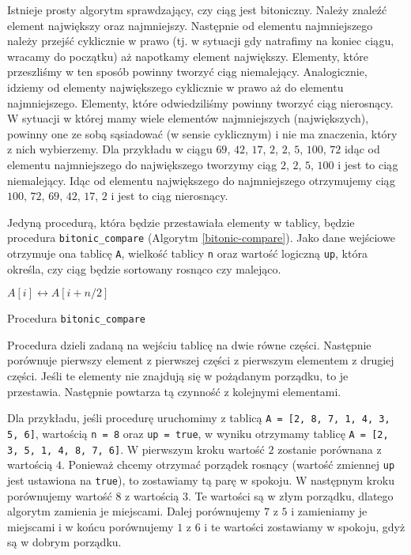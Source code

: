 Istnieje prosty algorytm sprawdzający, czy ciąg jest bitoniczny.
Należy znaleźć element największy oraz najmniejszy.
Następnie od elementu najmniejszego należy przejść cyklicznie w prawo (tj. w sytuacji gdy natrafimy na koniec ciągu, wracamy do początku) aż napotkamy element największy.
Elementy, które przeszliśmy w ten sposób powinny tworzyć ciąg niemalejący.
Analogicznie, idziemy od elementy największego cyklicznie w prawo aż do elementu najmniejszego.
Elementy, które odwiedziliśmy powinny tworzyć ciąg nierosnący.
W sytuacji w której mamy wiele elementów najmniejszych (największych), powinny one ze sobą sąsiadować (w sensie cyklicznym) i nie ma znaczenia, który z nich wybierzemy.
Dla przykładu w ciągu  $69$, $42$, $17$, $2$, $2$, $5$, $100$, $72$ idąc od elementu najmniejszego do największego tworzymy ciąg $2$, $2$, $5$, $100$ i jest to ciąg niemalejący.
Idąc od elementu największego do najmniejszego otrzymujemy ciąg $100$, $72$, $69$, $42$, $17$, $2$ i jest to ciąg nierosnący.

Jedyną procedurą, która będzie przestawiała elementy w tablicy, będzie procedura \texttt{bitonic\_compare} (Algorytm \ref{bitonic-compare}).
Jako dane wejściowe otrzymuje ona tablicę \texttt{A}, wielkość tablicy \texttt{n} oraz wartość logiczną \texttt{up}, która określa, czy ciąg będzie sortowany rosnąco czy malejąco.
\begin{algorithm}[h]
  \DontPrintSemicolon

  
  {
    {
      $A[i] \leftrightarrow A[i+n/2]$\;
    }
  }
  \caption{Procedura \texttt{bitonic\_compare}}
  \label{bitonic-compare}
\end{algorithm}
Procedura dzieli zadaną na wejściu tablicę na dwie równe części.
Następnie porównuje pierwszy element z pierwszej części z pierwszym elementem z drugiej części.
Jeśli te elementy nie znajdują się w pożądanym porządku, to je przestawia.
Następnie powtarza tą czynność z kolejnymi elementami.

Dla przykładu, jeśli procedurę uruchomimy z tablicą \texttt{A = [2, 8, 7, 1, 4, 3, 5, 6]}, wartością \texttt{n = 8} oraz \texttt{up = true}, w wyniku otrzymamy tablicę \texttt{A = [2, 3, 5, 1, 4, 8, 7, 6]}.
W pierwszym kroku wartość $2$ zostanie porównana z wartością $4$.
Ponieważ chcemy otrzymać porządek rosnący (wartość zmiennej \texttt{up} jest ustawiona na \texttt{true}), to zostawiamy tą parę w spokoju.
W następnym kroku porównujemy wartość $8$ z wartością $3$.
Te wartości są w złym porządku, dlatego algorytm zamienia je miejscami.
Dalej porównujemy $7$ z $5$ i zamieniamy je miejscami i w końcu porównujemy $1$ z $6$ i te wartości zostawiamy w spokoju, gdyż są w dobrym porządku.

